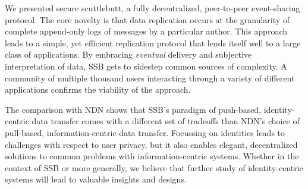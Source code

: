 \documentclass[10pt,sigconf]{acmart}
\begin{document}
We presented secure scuttlebutt, a fully decentralized, peer-to-peer event-sharing protocol. The core novelty is that data replication occurs at the granularity of complete append-only logs of messages by a particular author. This approach leads to a simple, yet efficient replication protocol that lends itself well to a large class of applications. By embracing \textit{eventual} delivery and subjective interpretation of data, SSB gets to sidestep common sources of complexity. A community of multiple thousand users interacting through a variety of different applications confirms the viability of the approach.

The comparison with NDN shows that SSB's paradigm of push-based, identity-centric data transfer comes with a different set of tradeoffs than NDN's choice of pull-based, information-centric data transfer. Focussing on identities leads to challenges with respect to user privacy, but it also enables elegant, decentralized solutions to common problems with information-centric systems. Whether in the context of SSB or more generally, we believe that further study of identity-centric systems will lead to valuable insights and designs.




\end{document}
